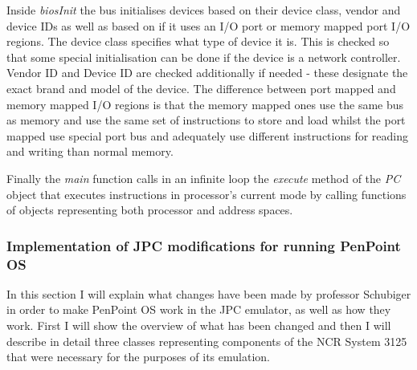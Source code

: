 
Inside \emph{biosInit} the bus initialises devices based on their device class,
vendor and device IDs as well as based on if it uses an I/O port or memory
mapped port I/O regions. The device class specifies what type of device it is.
This is checked so that some special initialisation can be done if the device
is a network controller. Vendor ID and Device ID are checked additionally if
needed - these designate the exact brand and model of the device. The
difference between port mapped and memory mapped I/O regions is that the memory
mapped ones use the same bus as memory and use the same set of instructions to
store and load whilst the port mapped use special port bus and adequately use
different instructions for reading and writing than normal memory.

Finally the \emph{main} function calls in an infinite loop the \emph{execute}
method of the \emph{PC} object that executes instructions in processor's
current mode by calling functions of objects representing both processor and
address spaces.

\subsubsection{Implementation of JPC modifications for running PenPoint OS}

In this section I will explain what changes have been made by professor
Schubiger in order to make PenPoint OS work in the JPC emulator, as well as how
they work. First I will show the overview of what has been changed and then
I will describe in detail three classes representing components of the NCR
System 3125 that were necessary for the purposes of its emulation.

